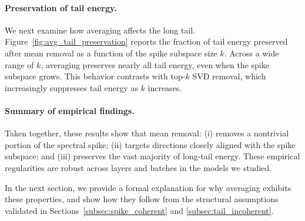 \paragraph{Preservation of tail energy.}
We next examine how averaging affects the long tail.
Figure~\ref{fig:avg_tail_preservation} reports the fraction of tail energy
preserved after mean removal as a function of the spike subspace size $k$.
Across a wide range of $k$, averaging preserves nearly all tail energy, even when
the spike subspace grows.
This behavior contrasts with top-$k$ SVD removal, which increasingly suppresses
tail energy as $k$ increases.

\paragraph{Summary of empirical findings.}
Taken together, these results show that mean removal:
(i) removes a nontrivial portion of the spectral spike;
(ii) targets directions closely aligned with the spike subspace; and
(iii) preserves the vast majority of long-tail energy.
These empirical regularities are robust across layers and batches in the models
we studied.

In the next section, we provide a formal explanation for why averaging exhibits
these properties, and show how they follow from the structural assumptions
validated in Sections~\ref{subsec:spike_coherent} and
\ref{subsec:tail_incoherent}.
